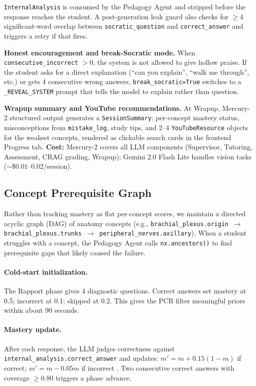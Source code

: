 \documentclass[11pt]{article}
\begin{document}
\texttt{InternalAnalysis} is consumed by the Pedagogy Agent and stripped
before the response reaches the student.
A post-generation leak guard also checks for $\geq$4 significant-word
overlap between \texttt{socratic\_question} and \texttt{correct\_answer}
and triggers a retry if that fires.

\textbf{Honest encouragement and break-Socratic mode.}
When \texttt{consecutive\_incorrect} $> 0$, the system is not allowed to give
hollow praise.
If the student asks for a direct explanation (``can you explain'',
``walk me through'', etc.) or gets 4 consecutive wrong answers,
\texttt{break\_socratic=True} switches to a \texttt{\_REVEAL\_SYSTEM} prompt
that tells the model to explain rather than question.

\textbf{Wrapup summary and YouTube recommendations.}
At Wrapup, Mercury-2 structured output generates a \texttt{SessionSummary}:
per-concept mastery status, misconceptions from \texttt{mistake\_log},
study tips, and 2--4 \texttt{YouTubeResource} objects for the weakest concepts,
rendered as clickable search cards in the frontend Progress tab.
\textbf{Cost:} Mercury-2 covers all LLM components (Supervisor, Tutoring, Assessment, CRAG grading, Wrapup); Gemini 2.0 Flash Lite handles vision tasks (${\sim}\$0.01$--$0.02$/session).

\subsection{Concept Prerequisite Graph}

Rather than tracking mastery as flat per-concept scores, we maintain a directed
acyclic graph (DAG) of anatomy concepts (e.g., \texttt{brachial\_plexus.origin $\to$
brachial\_plexus.trunks $\to$ peripheral\_nerves.axillary}).
When a student struggles with a concept, the Pedagogy Agent calls
\texttt{nx.ancestors()} to find prerequisite gaps that likely caused the failure.

\paragraph{Cold-start initialization.}
The Rapport phase gives 4 diagnostic questions.
Correct answers set mastery at 0.5; incorrect at 0.1; skipped at 0.2.
This gives the PCR filter meaningful priors within about 90 seconds.

\paragraph{Mastery update.}
After each response, the LLM judges correctness against
\texttt{internal\_analysis.correct\_answer} and updates:
$m' = m + 0.15(1-m)$ if correct; $m' = m - 0.05m$ if incorrect
\cite{corbett1994}.
Two consecutive correct answers with coverage $\geq 0.80$ triggers a phase advance.
\end{document}
